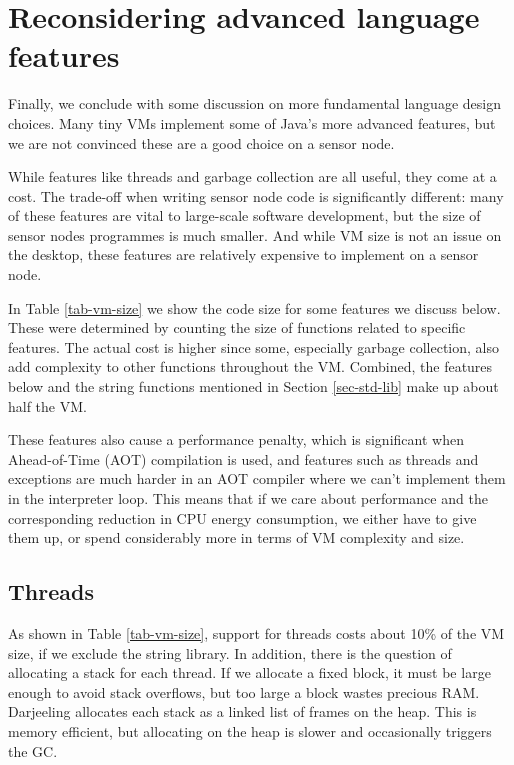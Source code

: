 \section{Reconsidering advanced language features}
\label{sec-advanced-features}
Finally, we conclude with some discussion on more fundamental language design choices. Many tiny VMs implement some of Java's more advanced features, but we are not convinced these are a good choice on a sensor node.

While features like threads and garbage collection are all useful, they come at a cost. The trade-off when writing sensor node code is significantly different: many of these features are vital to large-scale software development, but the size of sensor nodes programmes is much smaller. And while VM size is not an issue on the desktop, these features are relatively expensive to implement on a sensor node.

In Table \ref{tab-vm-size} we show the code size for some features we discuss below. These were determined by counting the size of functions related to specific features. The actual cost is higher since some, especially garbage collection, also add complexity to other functions throughout the VM. Combined, the features below and the string functions mentioned in Section \ref{sec-std-lib} make up about half the VM.

These features also cause a performance penalty, which is significant when Ahead-of-Time (AOT) compilation is used, and features such as threads and exceptions are much harder in an AOT compiler where we can't implement them in the interpreter loop. This means that if we care about performance and the corresponding reduction in CPU energy consumption, we either have to give them up, or spend considerably more in terms of VM complexity and size.


\subsection{Threads}
As shown in Table \ref{tab-vm-size}, support for threads costs about 10\% of the VM size, if we exclude the string library. In addition, there is the question of allocating a stack for each thread. If we allocate a fixed block, it must be large enough to avoid stack overflows, but too large a block wastes precious RAM. Darjeeling allocates each stack as a linked list of frames on the heap. This is memory efficient, but allocating on the heap is slower and occasionally triggers the GC.

